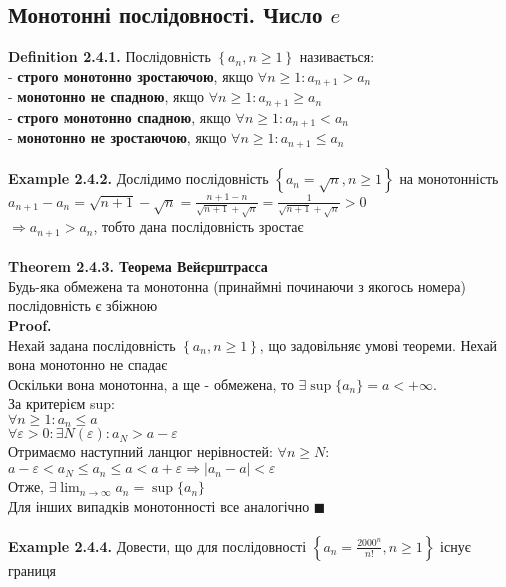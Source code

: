 \documentclass[a4paper, 14pt]{extarticle}
\def\bigline{\vspace{5mm}\\}
\def\bigline{\vspace{5mm}\\}
\def\qed{$\blacksquare$}
\def\sequence#1{$\displaystyle \left\{ {#1}, n\geq1 \right\}$}
\begin{document}
	\subsection{Монотонні послідовності. Число $e$}
	\textbf{Definition 2.4.1.} Послідовність \sequence{a_n} називається:\\
	- \textbf{строго монотонно зростаючою}, якщо $\forall n \geq 1: a_{n+1} > a_n$\\
	- \textbf{монотонно не спадною}, якщо $\forall n \geq 1: a_{n+1} \geq a_n$\\
	- \textbf{строго монотонно спадною}, якщо $\forall n \geq 1: a_{n+1} < a_n$\\
	- \textbf{монотонно не зростаючою}, якщо $\forall n \geq 1: a_{n+1} \leq a_n$\\
	\\
	\textbf{Example 2.4.2.} Дослідимо послідовність \sequence{a_n = \sqrt{n}} на монотонність\\
	$\displaystyle a_{n+1} - a_n = \sqrt{n+1} - \sqrt{n} = \frac{n+1-n}{\sqrt{n+1} + \sqrt{n}} = \frac{1}{\sqrt{n+1} + \sqrt{n}} > 0$\\
	$\Rightarrow a_{n+1}>a_n$, тобто дана послідовність зростає\\
	\bigline
	\textbf{Theorem 2.4.3. Теорема Вейєрштрасса}\\
	Будь-яка обмежена та монотонна (принаймні починаючи з якогось номера) послідовність є збіжною\\
	\textbf{Proof.}\\
	Нехай задана послідовність \sequence{a_n}, що задовільняє умові теореми. Нехай вона монотонно не спадає\\
	Оскільки вона монотонна, а ще - обмежена, то $\exists \sup\{a_n\} = a < +\infty$.\\
	За критерієм sup: \\
	$\forall n \geq 1: a_n \leq a$\\
	$\forall \varepsilon > 0: \exists N(\varepsilon): a_{N} > a - \varepsilon$\\
	Отримаємо наступний ланцюг нерівностей: $\forall n \geq N:$\\
	$a-\varepsilon < a_N \leq a_n \leq a < a + \varepsilon \Rightarrow |a_n-a|<\varepsilon$\\
	Отже, $\displaystyle \exists \lim_{n \to \infty} a_n = \sup\{a_n\}$\\
	Для інших випадків монотонності все аналогічно \qed \\
	\bigline
	\textbf{Example 2.4.4.} Довести, що для послідовності \sequence{a_n = \frac{2000^n}{n!}} існує границя\\
\end{document}
